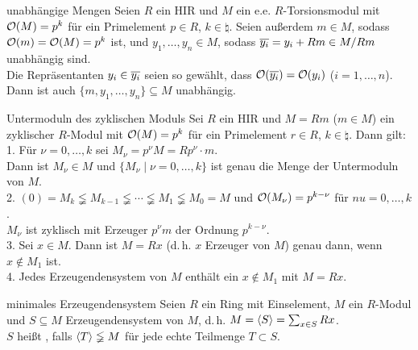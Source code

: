 \begin{Lemma}{unabhängige Mengen}
    Seien $R$ ein HIR und $M$ ein e.e. $R$-Torsionsmodul mit \\
    $\mathcal{O}(M) = p^k$ für ein Primelement $p \in R$, $k \in \natural$.
    Seien außerdem $m \in M$, sodass \\
    $\mathcal{O}(m) = \mathcal{O}(M) = p^k$ ist, und
    $y_1, \dotsc, y_n \in M$, sodass $\overline{y_i} = y_i + Rm \in M/Rm$
    unabhängig sind. \\
    Die Repräsentanten $y_i \in \overline{y_i}$ seien so gewählt, dass
    $\mathcal{O}(\overline{y_i}) = \mathcal{O}(y_i)$ ($i = 1, \dotsc, n$). \\
    Dann ist auch $\{m, y_1, \dotsc, y_n\} \subseteq M$ unabhängig.
\end{Lemma}

\begin{Satz}{Untermoduln des zyklischen Moduls}
    Sei $R$ ein HIR und $M = Rm$ ($m \in M$) ein zyklischer $R$-Modul mit
    $\mathcal{O}(M) = p^k$ für ein Primelement $r \in R$, $k \in \natural$.
    Dann gilt: \\
    1. Für $\nu = 0, \dotsc, k$ sei $M_\nu = p^\nu M = Rp^\nu \cdot m$. \\
    Dann ist $M_\nu \in M$ und $\{M_\nu \;|\; \nu = 0, \dotsc, k\}$ ist genau
    die Menge der Untermoduln von $M$. \\
    2. $(0) = M_k \lneqq M_{k-1} \lneqq \dotsb \lneqq M_1 \lneqq M_0 = M$
    und $\mathcal{O}(M_\nu) = p^{k - \nu}$ für $nu = 0, \dotsc, k$. \\
    $M_\nu$ ist zyklisch mit Erzeuger $p^\nu m$ der Ordnung $p^{k-\nu}$. \\
    3. Sei $x \in M$.
    Dann ist $M = Rx$ (d.\,h. $x$ Erzeuger von $M$) genau dann,
    wenn $x \notin M_1$ ist. \\
    4. Jedes Erzeugendensystem von $M$ enthält ein $x \notin M_1$ mit $M = Rx$.
\end{Satz}

\begin{Def}{minimales Erzeugendensystem}
    Seien $R$ ein Ring mit Einselement, $M$ ein $R$-Modul und
    $S \subseteq M$ Erzeugendensystem von $M$, d.\,h.
    $M = \langle S \rangle = \sum_{x \in S} Rx$. \\
    $S$ heißt , falls
    $\langle T \rangle \lneqq M$ für jede echte Teilmenge $T \subset S$.
\end{Def}

\pagebreak

